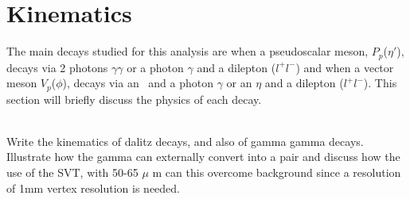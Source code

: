 \section{Kinematics}\label{sec:kinematics}
The main decays studied for this analysis are when a pseudoscalar meson, $P_p$($\eta'$), decays via 2 photons $\gamma \gamma$ or a photon $\gamma$ and a dilepton ($l^{+}l^{-}$) and when a vector meson $V_p$($\phi$), decays via an \etaT \  and a photon $\gamma$ or an $\eta$ and a dilepton ($l^{+}l^{-}$). This section will briefly discuss the physics of each decay.

\\Write the kinematics of dalitz decays, and also of gamma gamma decays. Illustrate how the gamma can externally convert into a \epem pair and discuss how the use of the SVT, with 50-65 $\mu$ m can this overcome background since a resolution of 1mm vertex resolution is needed.